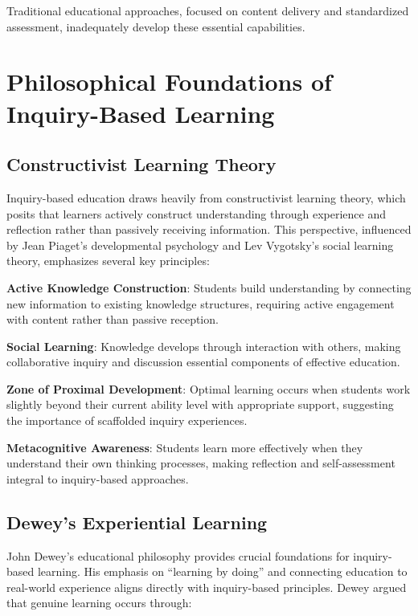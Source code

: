 \documentclass[
  Letterpaper,
]{scrbook}
\begin{document}
Traditional educational approaches, focused on content delivery and
standardized assessment, inadequately develop these essential
capabilities.

\section{Philosophical Foundations of Inquiry-Based
Learning}\label{philosophical-foundations-of-inquiry-based-learning}

\subsection{Constructivist Learning
Theory}\label{constructivist-learning-theory}

Inquiry-based education draws heavily from constructivist learning
theory, which posits that learners actively construct understanding
through experience and reflection rather than passively receiving
information. This perspective, influenced by Jean Piaget's developmental
psychology and Lev Vygotsky's social learning theory, emphasizes several
key principles:

\textbf{Active Knowledge Construction}: Students build understanding by
connecting new information to existing knowledge structures, requiring
active engagement with content rather than passive reception.

\textbf{Social Learning}: Knowledge develops through interaction with
others, making collaborative inquiry and discussion essential components
of effective education.

\textbf{Zone of Proximal Development}: Optimal learning occurs when
students work slightly beyond their current ability level with
appropriate support, suggesting the importance of scaffolded inquiry
experiences.

\textbf{Metacognitive Awareness}: Students learn more effectively when
they understand their own thinking processes, making reflection and
self-assessment integral to inquiry-based approaches.

\subsection{Dewey's Experiential
Learning}\label{deweys-experiential-learning}

John Dewey's educational philosophy provides crucial foundations for
inquiry-based learning. His emphasis on ``learning by doing'' and
connecting education to real-world experience aligns directly with
inquiry-based principles. Dewey argued that genuine learning occurs
through:
\end{document}
